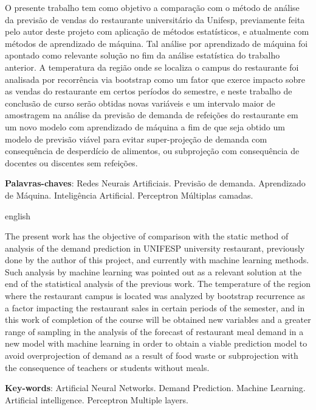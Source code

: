 \documentclass[	12pt, Times, openright, twoside, a4paper, english, brazil]{abntex2}
\begin{document}
    \begin{resumo}
    O presente trabalho tem como objetivo a comparação com o método de análise da previsão de vendas do restaurante universitário da Unifesp, previamente feita pelo autor deste projeto com aplicação de métodos estatísticos, e atualmente com métodos de aprendizado de máquina. Tal análise por aprendizado de máquina foi apontado como relevante solução no fim da análise estatística do trabalho anterior. A temperatura da região onde se localiza o campus do restaurante foi analisada por recorrência via bootstrap como um fator que exerce impacto sobre as vendas do restaurante em certos períodos do semestre, e neste trabalho de conclusão de curso serão obtidas novas variáveis e um intervalo maior de amostragem na análise da previsão de demanda de refeições do restaurante em um novo modelo com aprendizado de máquina a fim de que seja obtido um modelo de previsão viável para evitar super-projeção de demanda com consequência de desperdício de alimentos, ou subprojeção com consequência de docentes ou discentes sem refeições.
     
     \vspace{\onelineskip}
        
     \noindent
     \textbf{Palavras-chaves}: Redes Neurais Artificiais. Previsão de demanda. Aprendizado de Máquina. Inteligência Artificial. Perceptron Múltiplas camadas. 
     
    \end{resumo}

    \begin{resumo}[Abstract]
     \begin{otherlanguage*}{english}

    The present work has the objective of comparison with the static method of analysis of the demand prediction in UNIFESP university restaurant, previously done by the author of this project, and currently with machine learning methods. Such analysis by machine learning was pointed out as a relevant solution at the end of the statistical analysis of the previous work. The temperature of the region where the restaurant campus is located was analyzed by bootstrap recurrence as a factor impacting the restaurant sales in certain periods of the semester, and in this work of completion of the course will be obtained new variables and a greater range of sampling in the analysis of the forecast of restaurant meal demand in a new model with machine learning in order to obtain a viable prediction model to avoid overprojection of demand as a result of food waste or subprojection with the consequence of teachers or students without meals.

       \vspace{\onelineskip}
     
       \noindent 
       \textbf{Key-words}: Artificial Neural Networks. Demand Prediction. Machine Learning. Artificial intelligence. Perceptron Multiple layers.
     \end{otherlanguage*}
    \end{resumo}
\end{document}
